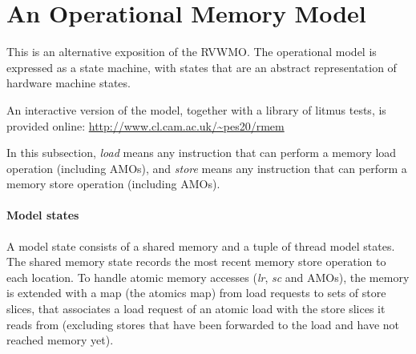 \section{An Operational Memory Model}

This is an alternative exposition of the RVWMO.
The operational model is expressed as a state machine, with states that are an abstract representation of hardware machine states.

An interactive version of the model, together with a library of litmus tests,
is provided online: \url{http://www.cl.cam.ac.uk/~pes20/rmem}

In this subsection, {\em load} means any instruction that can perform a memory load operation (including AMOs), and {\em store} means any instruction that can perform a memory store operation (including AMOs).

\paragraph{Model states}
A model state consists of a shared memory and a tuple of thread model states.
%
%
%
%
The shared memory state records the most recent memory store operation to each location.
To handle atomic memory accesses ({\em  lr}, {\em sc} and AMOs), the memory is extended with a map (the atomics map) from load requests to sets of store slices, that associates a load request of an atomic load with the store slices it reads from (excluding stores that have been forwarded to the load and have not reached memory yet).

